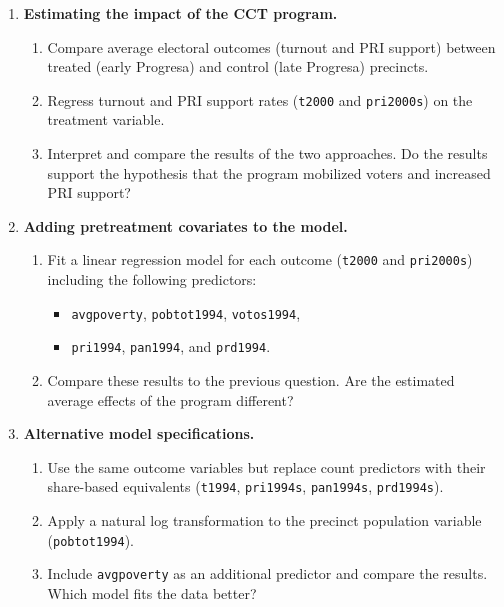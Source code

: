 \documentclass[12pt]{article}
\begin{document}
\begin{enumerate}
    \item \textbf{Estimating the impact of the CCT program.}
    \begin{enumerate}[label=(\alph*)]
        \item Compare average electoral outcomes (turnout and PRI support) between treated (early Progresa) and control (late Progresa) precincts.
        \item Regress turnout and PRI support rates (\texttt{t2000} and \texttt{pri2000s}) on the treatment variable.
        \item Interpret and compare the results of the two approaches. Do the results support the hypothesis that the program mobilized voters and increased PRI support?
    \end{enumerate}

    \item \textbf{Adding pretreatment covariates to the model.}
    \begin{enumerate}[label=(\alph*)]
        \item Fit a linear regression model for each outcome (\texttt{t2000} and \texttt{pri2000s}) including the following predictors:
        \begin{itemize}
            \item \texttt{avgpoverty}, \texttt{pobtot1994}, \texttt{votos1994},
            \item \texttt{pri1994}, \texttt{pan1994}, and \texttt{prd1994}.
        \end{itemize}
        \item Compare these results to the previous question. Are the estimated average effects of the program different?
    \end{enumerate}

    \item \textbf{Alternative model specifications.}
    \begin{enumerate}[label=(\alph*)]
        \item Use the same outcome variables but replace count predictors with their share-based equivalents (\texttt{t1994}, \texttt{pri1994s}, \texttt{pan1994s}, \texttt{prd1994s}).
        \item Apply a natural log transformation to the precinct population variable (\texttt{pobtot1994}).
        \item Include \texttt{avgpoverty} as an additional predictor and compare the results. Which model fits the data better?
    \end{enumerate}


\end{enumerate}
\end{document}
